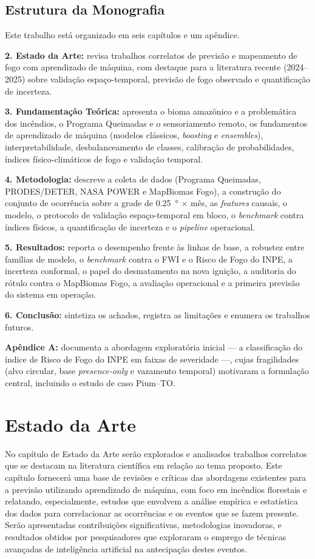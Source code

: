 \documentclass[tcc2]{uftex}
\begin{document}
\section{Estrutura da Monografia}

Este trabalho está organizado em seis capítulos e um apêndice.

\textbf{2. Estado da Arte:} revisa trabalhos correlatos de previsão e mapeamento de fogo com aprendizado de máquina, com destaque para a literatura recente (2024--2025) sobre validação espaço-temporal, previsão de fogo observado e quantificação de incerteza.

\textbf{3. Fundamentação Teórica:} apresenta o bioma amazônico e a problemática dos incêndios, o Programa Queimadas e o sensoriamento remoto, os fundamentos de aprendizado de máquina (modelos clássicos, \emph{boosting} e \emph{ensembles}), interpretabilidade, desbalanceamento de classes, calibração de probabilidades, índices físico-climáticos de fogo e validação temporal.

\textbf{4. Metodologia:} descreve a coleta de dados (Programa Queimadas, PRODES/DETER, NASA POWER e MapBiomas Fogo), a construção do conjunto de ocorrência sobre a grade de \SI{0,25}{\degree} $\times$ mês, as \emph{features} causais, o modelo, o protocolo de validação espaço-temporal em bloco, o \emph{benchmark} contra índices físicos, a quantificação de incerteza e o \emph{pipeline} operacional.

\textbf{5. Resultados:} reporta o desempenho frente às linhas de base, a robustez entre famílias de modelo, o \emph{benchmark} contra o FWI e o Risco de Fogo do INPE, a incerteza conformal, o papel do desmatamento na nova ignição, a auditoria do rótulo contra o MapBiomas Fogo, a avaliação operacional e a primeira previsão do sistema em operação.

\textbf{6. Conclusão:} sintetiza os achados, registra as limitações e enumera os trabalhos futuros.

\textbf{Apêndice A:} documenta a abordagem exploratória inicial --- a classificação do índice de Risco de Fogo do INPE em faixas de severidade ---, cujas fragilidades (alvo circular, base \emph{presence-only} e vazamento temporal) motivaram a formulação central, incluindo o estudo de caso Pium--TO.

\chapter{Estado da Arte}

No capítulo de Estado da Arte serão explorados e analisados trabalhos correlatos que se destacam na literatura científica em relação ao tema proposto. Este capítulo fornecerá uma base de revisões e críticas das abordagens existentes para a previsão utilizando aprendizado de máquina, com foco em incêndios florestais e relatando, especialmente, estudos que envolvem a análise empírica e estatística dos dados para correlacionar as ocorrências e os eventos que se fazem presente. Serão apresentadas contribuições significativas, metodologias inovadoras, e resultados obtidos por pesquisadores que exploraram o emprego de técnicas avançadas de inteligência artificial na antecipação destes eventos.
\end{document}
